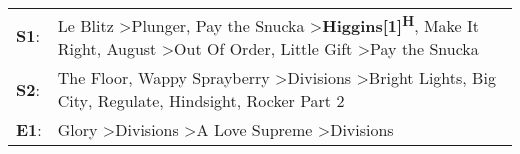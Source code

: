 \begin{supertabular}{p{0.03\textwidth}p{0.92\textwidth}}
 \textbf{S1}:  &  Le Blitz\textsuperscript{} \textgreater \enspace Plunger\textsuperscript{}, \enspace Pay the Snucka\textsuperscript{} \textgreater \enspace \textbf{Higgins[1]\textsuperscript{H}}, \enspace Make It Right\textsuperscript{}, \enspace August\textsuperscript{} \textgreater \enspace Out Of Order\textsuperscript{}, \enspace Little Gift\textsuperscript{} \textgreater \enspace Pay the Snucka\textsuperscript{}  \enspace  \\
 \textbf{S2}:  &                                                                                                      The Floor\textsuperscript{}, \enspace Wappy Sprayberry\textsuperscript{} \textgreater \enspace Divisions\textsuperscript{} \textgreater \enspace Bright Lights, Big City\textsuperscript{}, \enspace Regulate\textsuperscript{}, \enspace Hindsight\textsuperscript{}, \enspace Rocker Part 2\textsuperscript{}  \enspace  \\
 \textbf{E1}:  &                                                                                                                                                                                                                                   Glory\textsuperscript{} \textgreater \enspace Divisions\textsuperscript{} \textgreater \enspace A Love Supreme\textsuperscript{} \textgreater \enspace Divisions\textsuperscript{}  \enspace  \\
\end{supertabular}
